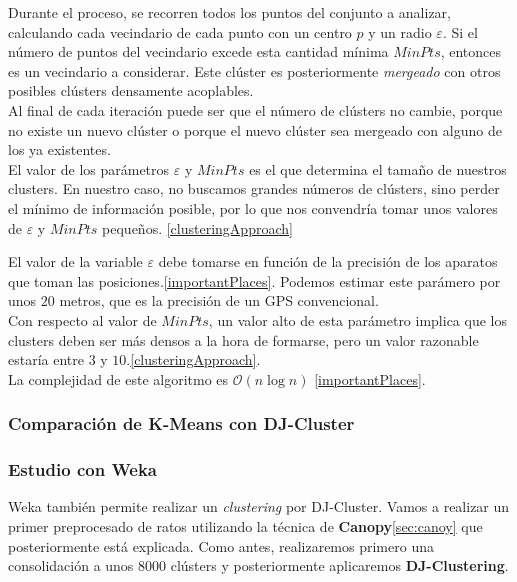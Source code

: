 \documentclass[a4paper, 12pt]{article}
\begin{document}
Durante el proceso, se recorren todos los puntos del conjunto a analizar, calculando cada vecindario de cada punto con un centro $p$ y un radio $\varepsilon$. Si el n\'umero de puntos del vecindario excede esta cantidad m\'inima $MinPts$, entonces es un vecindario a considerar. Este cl\'uster es posteriormente \textit{mergeado} con otros posibles cl\'usters densamente acoplables. \\

Al final de cada iteraci\'on puede ser que el n\'umero de cl\'usters no cambie, porque no existe un nuevo cl\'uster o porque el nuevo cl\'uster sea mergeado con alguno de los ya existentes.\\


El valor de los par\'ametros $\varepsilon$ y $MinPts$ es el que determina el tama\~no de nuestros clusters. En nuestro caso, no buscamos grandes n\'umeros de cl\'usters, sino perder el m\'inimo de informaci\'on posible, por lo que nos convendr\'ia tomar unos valores de $\varepsilon$ y $MinPts$ peque\~nos. \ref{clusteringApproach}

El valor de la variable $\varepsilon$ debe tomarse en funci\'on de la precisi\'on de los aparatos que toman las posiciones.\ref{importantPlaces}. Podemos estimar este par\'amero por unos $20$ metros, que es la precisi\'on de un GPS convencional. \\

Con respecto al valor de $MinPts$, un valor alto de esta par\'ametro implica que los clusters deben ser m\'as densos a la hora de formarse, pero un valor razonable estar\'ia entre $3$ y $10$.\ref{clusteringApproach}.\\

La complejidad de este algoritmo es $\mathcal{O}(n\log{}n)$ \ref{importantPlaces}. \\



\subsubsection{Comparaci\'on de K-Means con DJ-Cluster}

\subsubsection{Estudio con Weka}

Weka tambi\'en permite realizar un \textit{clustering} por DJ-Cluster. Vamos a realizar un primer preprocesado de ratos utilizando la t\'ecnica de \textbf{Canopy}\ref{sec:canoy} que posteriormente est\'a explicada. Como antes, realizaremos primero una consolidaci\'on a unos 8000 cl\'usters y posteriormente aplicaremos \textbf{DJ-Clustering}.\\
\end{document}
